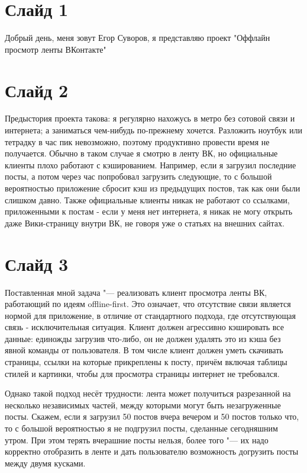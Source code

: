 \documentclass[a4paper]{article}
\begin{document}

\section{Слайд 1}

Добрый день, меня зовут Егор Суворов, я представляю проект "Оффлайн просмотр ленты ВКонтакте"

\section{Слайд 2}

Предыстория проекта такова: я регулярно нахожусь в метро без сотовой связи и интернета; а
заниматься чем-нибудь по-прежнему хочется.
Разложить ноутбук или тетрадку в час пик невозможно, поэтому продуктивно провести время не получается.
Обычно в таком случае я смотрю в ленту ВК, но официальные клиенты плохо работают с кэшированием.
Например, если я загрузил последние посты, а потом через час попробовал загрузить следующие, то с большой
вероятностью приложение сбросит кэш из предыдущих постов, так как они были слишком давно.
Также официальные клиенты никак не работают со ссылками, приложенными к постам - если у меня нет интернета,
я никак не могу открыть даже Вики-страницу внутри ВК, не говоря уже о статьях на внешних сайтах.

\section{Слайд 3}

Поставленная мной задача "--- реализовать клиент просмотра ленты ВК, работающий по идеям offline-first.
Это означает, что отсутствие связи является нормой для приложение, в отличие от стандартного подхода,
где отсутствующая связь - исключительная ситуация.
Клиент должен агрессивно кэшировать все данные: единожды загрузив что-либо, он не должен удалять это из кэша
без явной команды от пользователя.
В том числе клиент должен уметь скачивать страницы, ссылки на которые прикреплены к посту, причём включая
таблицы стилей и картинки, чтобы для просмотра страницы интернет не требовался.

Однако такой подход несёт трудности: лента может получиться разрезанной на несколько независимых частей,
между которыми могут быть незагруженные посты.
Скажем, если я загрузил 50 постов вчера вечером и 50 постов только что, то с большой вероятностью я не подгрузил
посты, сделанные сегодняшним утром.
При этом терять вчерашние посты нельзя, более того "--- их надо корректно отобразить в ленте и дать пользователю
возможность догрузить посты между двумя кусками.
\end{document}
